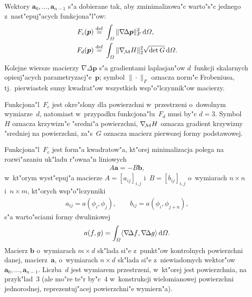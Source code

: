 Wektory $\bm{a}_0,\ldots,\bm{a}_{n-1}$ s"a dobierane tak, aby zminimalizowa"c
warto"s"c jednego z~nast"epuj"acych funkcjona"l"ow:
\begin{align*}
  F_c(\bm{p}) \stackrel{\mathrm{def}}{=}{}&
  \int_{\varOmega}\|\nabla\!\Delta\bm{p}\|_F^2\,\mathrm{d}\varOmega, \\
  F_d(\bm{p}) \stackrel{\mathrm{def}}{=}{}&
  \int_{\varOmega}\|\nabla_{\!\cal M}H\|_2^2\sqrt{\det G}\,\mathrm{d}\varOmega.
\end{align*}
Kolejne wiersze macierzy $\nabla\!\Delta\bm{p}$ s"a gradientami laplasjan"ow
$d$~funkcji skalarnych opisuj"acych parametryzacj"e~$\bm{p}$; symbol
$\|\cdot\|_F$ oznacza norm"e Frobeniusa, tj.\ pierwiastek sumy kwadrat"ow
wszystkich wsp"o"lczynnik"ow macierzy.

Funkcjona"l~$F_c$ jest okre"slony dla powierzchni w~przestrzeni o~dowolnym
wymiarze~$d$, natomiast w~przypadku funkcjona"lu~$F_d$ musi by"c $d=3$.
Symbol~$H$ oznacza krzywizn"e "sredni"a powierzchni, $\nabla_{\!\cal M}H$
oznacza gradient krzywizny "sredniej na powierzchni, za"s~$G$ oznacza
macierz pierwszej formy podstawowej.

Funkcjona"l~$F_c$ jest form"a kwadratow"a, kt"orej minimalizacja polega na
rozwi"azaniu uk"ladu r"owna"n liniowych
\begin{align}\label{eq:g2h:Ritz:eq}
  A\bm{a}=-B\bm{b},
\end{align}
w~kt"orym wyst"epuj"a macierze $A=[a_{ij}]_{i,j}$ i~$B=[b_{ij}]_{i,j}$
o~wymiarach $n\times n$ i~$n\times m$, kt"orych wsp"o"lczynniki
\begin{align*}
  a_{ij} = a(\phi_i,\phi_j), \qquad
  b_{ij} = a(\phi_i,\phi_{j+n}),
\end{align*}
s"a warto"sciami formy dwuliniowej
\begin{align*}
  a(f,g) = \int_{\varOmega}\scp{\nabla\!\Delta f}%
  {\nabla\!\Delta g}\,\mathrm{d}\varOmega.
\end{align*}
Macierz $\bm{b}$ o~wymiarach $m\times d$ sk"lada si"e z~punkt"ow kontrolnych
powierzchni danej, macierz~$\bm{a}$, o~wymiarach $n\times d$ sk"lada si"e
z~niewiadomych wektor"ow $\bm{a}_0,\ldots,\bm{a}_{n-1}$. Liczba~$d$ jest
wymiarem przestrzeni, w~kt"orej jest powierzchnia, na przyk"lad~$3$
(ale mo"re te"r by"c~$4$ w~konstrukcji wielomianowej powierzchni
jednorodnej, reprezentuj"acej powierzchni"e wymiern"a).


